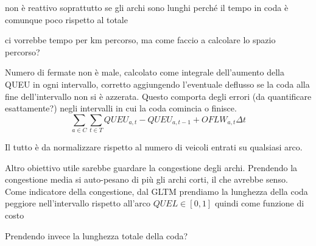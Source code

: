 non è reattivo soprattutto se gli archi sono lunghi perché il tempo in coda è comunque poco rispetto al totale

ci vorrebbe tempo per km percorso, ma come faccio a calcolare lo spazio percorso?


Numero di fermate non è male, calcolato come integrale dell'aumento della QUEU in ogni intervallo, corretto aggiungendo l'eventuale deflusso se la coda alla fine dell'intervallo non si è azzerata.
Questo comporta degli errori (da quantificare esattamente?) negli intervalli in cui la coda comincia o finisce.
$$
\sum_{a \in C} \sum_{t \in T} QUEU_{a,t} - QUEU_{a,t-1} + OFLW_{a,t} \Delta t
$$

Il tutto è da normalizzare rispetto al numero di veicoli entrati su qualsiasi arco.


Altro obiettivo utile sarebbe guardare la congestione degli archi.
Prendendo la congestione media si auto-pesano di più gli archi corti, il che avrebbe senso.
Come indicatore della congestione, dal GLTM prendiamo la lunghezza della coda peggiore nell'intervallo rispetto all'arco $QUEL\in[0,1]$ quindi come funzione di costo

Prendendo invece la lunghezza totale della coda?